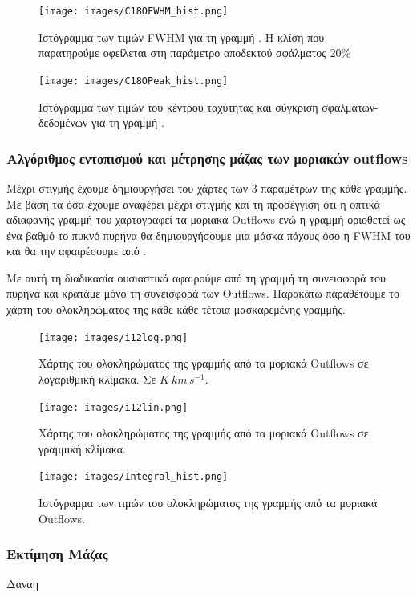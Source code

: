 \documentclass[a4paper,12pt]{memoir}
\begin{document}
\begin{figure}[h!]
	\centering
	\texttt{[image: images/C18OFWHM\_hist.png]}
	\caption{Ιστόγραμμα των τιμών FWHM για τη γραμμή . Η κλίση που παρατηρούμε οφείλεται στη παράμετρο αποδεκτού σφάλματος 20\%}
	
	\centering
	\texttt{[image: images/C18OPeak\_hist.png]}
	\caption{Ιστόγραμμα των τιμών του κέντρου ταχύτητας και σύγκριση σφαλμάτων-δεδομένων για τη γραμμή .}
\end{figure}

\subsubsection{Αλγόριθμος εντοπισμού και μέτρησης μάζας των μοριακών outflows}
Μέχρι στιγμής έχουμε δημιουργήσει του χάρτες των 3 παραμέτρων της κάθε γραμμής. Με βάση τα όσα έχουμε αναφέρει μέχρι στιγμής και τη προσέγγιση ότι η οπτικά αδιαφανής γραμμή του  χαρτογραφεί τα μοριακά Outflows ενώ η γραμμή  οριοθετεί ως ένα βαθμό το πυκνό πυρήνα θα δημιουργήσουμε μια μάσκα πάχους όσο η FWHM του  και θα την αφαιρέσουμε από .

Με αυτή τη διαδικασία ουσιαστικά αφαιρούμε από τη γραμμή  τη συνεισφορά του πυρήνα και κρατάμε μόνο τη συνεισφορά των Outflows. Παρακάτω παραθέτουμε το χάρτη του ολοκληρώματος της κάθε κάθε τέτοια μασκαρεμένης γραμμής.

\begin{figure}[h!]
	\centering
	\texttt{[image: images/i12log.png]}
	\caption{Χάρτης του ολοκληρώματος της γραμμής  από τα μοριακά Outflows σε λογαριθμική κλίμακα. Σε $K\ km\, s^{-1}$.}
	
	
	\centering
	\texttt{[image: images/i12lin.png]}
	\caption{Χάρτης του ολοκληρώματος της γραμμής  από τα μοριακά Outflows σε γραμμική κλίμακα.}
\end{figure}

\begin{figure}[h!]
	\centering
	\texttt{[image: images/Integral\_hist.png]}
	\caption{Ιστόγραμμα των τιμών του ολοκληρώματος της γραμμής  από τα μοριακά Outflows.}
\end{figure}

\subsubsection{Εκτίμηση Μάζας}
Δαναη

\end{document}
